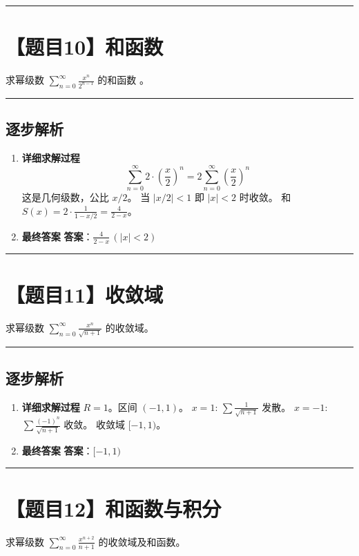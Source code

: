 \documentclass[UTF8]{ctexart}
\newenvironment{redenv}{\color{red}}{}
\newenvironment{detailedanalysis}{%
    \color{red}
    \begin{enumerate}[label=\textbf{第\arabic*步：}, leftmargin=*, align=left, itemsep=1.5ex]
}{%
    \end{enumerate}
}
\newcommand{\problemrule}{\noindent\rule{\textwidth}{1.5pt}\vspace{-0.8em}}
\newcommand{\analysisrule}{\noindent\rule{\textwidth}{0.8pt}\vspace{-0.8em}}
\newcommand{\blank}[1]{\underline{\hspace{#1}}}
\begin{document}
\problemrule
\section*{【题目10】和函数}
求幂级数 $ \sum_{n=0}^{\infty} \frac{x^{n}}{2^{n-1}} $ 的和函数 \blank{2cm}。

\begin{redenv}
\analysisrule
\subsection*{逐步解析}

\begin{detailedanalysis}
\item \textbf{详细求解过程}
$$ \sum_{n=0}^{\infty} 2 \cdot (\frac{x}{2})^n = 2 \sum_{n=0}^{\infty} (\frac{x}{2})^n $$
这是几何级数，公比 $x/2$。
当 $|x/2| < 1$ 即 $|x| < 2$ 时收敛。
和 $S(x) = 2 \cdot \frac{1}{1 - x/2} = \frac{4}{2-x}$。

\item \textbf{最终答案}
\textbf{答案}：$ \frac{4}{2-x} \, (|x|<2) $
\end{detailedanalysis}
\end{redenv}

\problemrule
\section*{【题目11】收敛域}
求幂级数 $ \sum_{n=0}^{\infty}\frac{x^{n}}{\sqrt{n+1}} $ 的收敛域。

\begin{redenv}
\analysisrule
\subsection*{逐步解析}

\begin{detailedanalysis}
\item \textbf{详细求解过程}
$R=1$。区间 $(-1, 1)$。
$x=1$: $\sum \frac{1}{\sqrt{n+1}}$ 发散。
$x=-1$: $\sum \frac{(-1)^n}{\sqrt{n+1}}$ 收敛。
收敛域 $[-1, 1)$。

\item \textbf{最终答案}
\textbf{答案}：$ [-1, 1) $
\end{detailedanalysis}
\end{redenv}

\problemrule
\section*{【题目12】和函数与积分}
求幂级数 $ \sum_{n=0}^{\infty} \frac{x^{n+2}}{n+1} $ 的收敛域及和函数。
\end{document}
